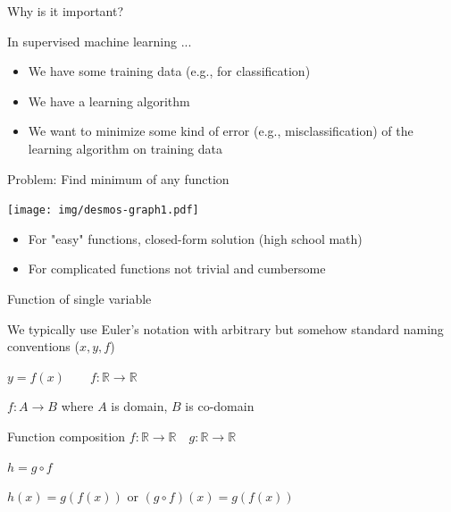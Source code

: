 \documentclass[12pt,aspectratio=169,handout]{beamer}
\begin{document}
\begin{frame}{Why is it important?}

In supervised machine learning ...
	
\pause

	\begin{itemize}
		\item We have some training data (e.g., for classification)
		\item We have a learning algorithm
		\item We want to minimize some kind of error (e.g., misclassification) of the learning algorithm on training data
	\end{itemize}
	
\end{frame}


\begin{frame}{Problem: Find minimum of any function}
	
	\texttt{[image: img/desmos-graph1.pdf]}
	
	\begin{itemize}
		\item For "easy" functions, closed-form solution (high school math)
		\item For complicated functions not trivial and cumbersome
	\end{itemize}
	
	
	
\end{frame}







\begin{frame}{Function of single variable}
	
	We typically use Euler's notation with arbitrary but somehow standard naming conventions ($x, y, f$)
	
	$y = f (x) \qquad f: \mathbb{R} \to \mathbb{R}$
	
	$f : A \to B$ where $A$ is domain, $B$ is co-domain
	
	\bigskip
	
	\begin{block}{Function composition}
		$f: \mathbb{R} \to \mathbb{R} \quad g: \mathbb{R} \to \mathbb{R}$
		
		$h = g \circ f$
		
		$h(x) = g(f(x))$ or $(g \circ f)(x)= g(f(x))$
	\end{block}
	
\end{frame}
\end{document}
